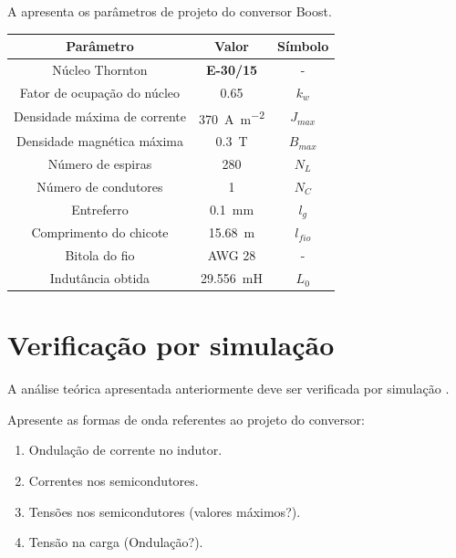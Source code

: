 A  apresenta os parâmetros de projeto do conversor Boost.
\begin{table}[!ht]
	\centering
	\label{tab:IndutorBoost}
	\begin{tabular}{@{}ccc@{}}
		\toprule
		\textbf{Parâmetro} & \textbf{Valor} & \textbf{Símbolo} \\ \midrule	
			Núcleo  Thornton      & \textbf{E-30/15}    & -  \\				
		Fator de ocupação do núcleo & \SI{0.65}{}     & $k_w$  \\
		Densidade máxima de corrente & \SI{370}{\ampere\per\square\meter}     & $J_{max}$  \\
		Densidade magnética máxima & \SI{0.3}{\tesla}     & $B_{max}$  \\			
		Número de espiras        & \SI{280}{}     & $N_L$  \\	
		Número de condutores        & \SI{1}{}     & $N_C$  \\		
		Entreferro         &  \SI{0.1}{\mm}      & $l_g$  \\
		Comprimento do chicote        &  \SI{15.68}{\m}      & $l_{fio}$  \\
		Bitola do fio        &  AWG 28     & -  \\
		Indutância obtida         & \SI{29.556}{\milli\henry}     & $L_0$  \\ \bottomrule	
	\end{tabular}
\end{table}



\section{Verificação por simulação}

A análise teórica apresentada anteriormente deve ser verificada por simulação \cite{noauthor_psim_nodate}.
									
 Apresente as formas de onda referentes ao projeto do conversor:
 
\begin{enumerate}
	\item Ondulação de corrente no indutor.
	\item Correntes nos semicondutores.
	\item Tensões nos semicondutores (valores máximos?).
	\item Tensão na carga (Ondulação?).
\end{enumerate}


